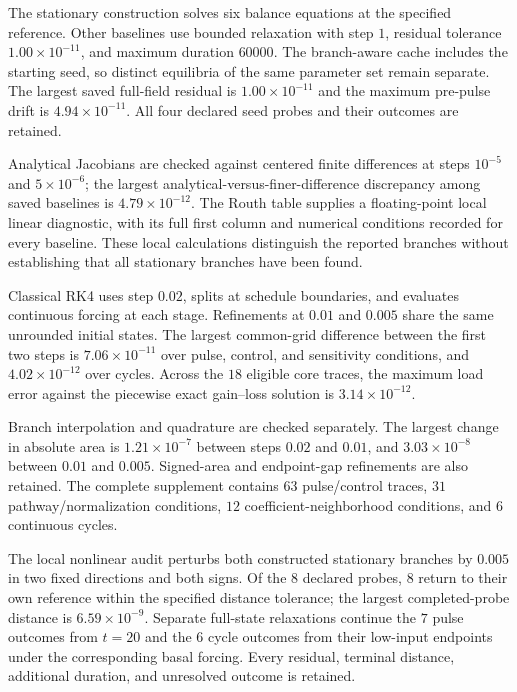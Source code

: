 
The stationary construction solves six balance equations at the specified reference. Other baselines use bounded relaxation with step $1$, residual tolerance $1.00\times10^{-11}$, and maximum duration $60000$. The branch-aware cache includes the starting seed, so distinct equilibria of the same parameter set remain separate. The largest saved full-field residual is $1.00\times10^{-11}$ and the maximum pre-pulse drift is $4.94\times10^{-11}$. All four declared seed probes and their outcomes are retained.

Analytical Jacobians are checked against centered finite differences at steps $10^{-5}$ and $5\times10^{-6}$; the largest analytical-versus-finer-difference discrepancy among saved baselines is $4.79\times10^{-12}$. The Routh table supplies a floating-point local linear diagnostic, with its full first column and numerical conditions recorded for every baseline. These local calculations distinguish the reported branches without establishing that all stationary branches have been found.

Classical RK4 uses step $0.02$, splits at schedule boundaries, and evaluates continuous forcing at each stage. Refinements at $0.01$ and $0.005$ share the same unrounded initial states. The largest common-grid difference between the first two steps is $7.06\times10^{-11}$ over pulse, control, and sensitivity conditions, and $4.02\times10^{-12}$ over cycles. Across the $18$ eligible core traces, the maximum load error against the piecewise exact gain--loss solution is $3.14\times10^{-12}$.

Branch interpolation and quadrature are checked separately. The largest change in absolute area is $1.21\times10^{-7}$ between steps $0.02$ and $0.01$, and $3.03\times10^{-8}$ between $0.01$ and $0.005$. Signed-area and endpoint-gap refinements are also retained. The complete supplement contains $63$ pulse/control traces, $31$ pathway/normalization conditions, $12$ coefficient-neighborhood conditions, and $6$ continuous cycles.

The local nonlinear audit perturbs both constructed stationary branches by $0.005$ in two fixed directions and both signs. Of the $8$ declared probes, $8$ return to their own reference within the specified distance tolerance; the largest completed-probe distance is $6.59\times10^{-9}$. Separate full-state relaxations continue the $7$ pulse outcomes from $t=20$ and the $6$ cycle outcomes from their low-input endpoints under the corresponding basal forcing. Every residual, terminal distance, additional duration, and unresolved outcome is retained.
